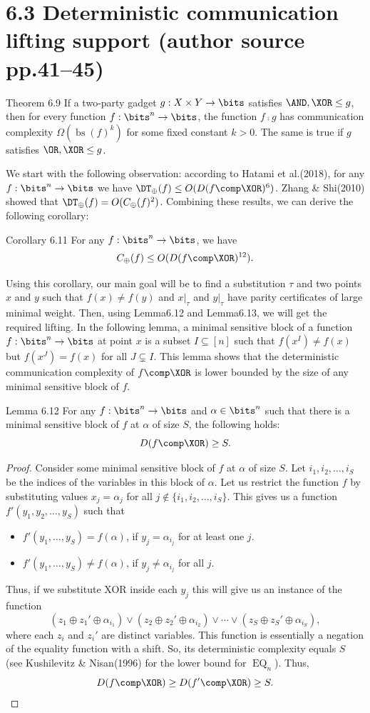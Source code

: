 \section*{6.3 Deterministic communication lifting support (author source pp.41--45)}
\begin{originalresult}{Theorem 6.9}
If a two-party gadget $g:X\times Y\to\bits$ satisfies $\AND,\XOR\le g$, then for every function $f:\bits^n\to\bits$, the function $f\comp g$ has communication complexity $\Omega(\operatorname{bs}(f)^k)$ for some fixed constant $k>0$. The same is true if $g$ satisfies $\OR,\XOR\le g$.
\end{originalresult}
We start with the following observation: according to Hatami et al.(2018), for any $f:\bits^n\to\bits$ we have $\DT_\oplus(f)\le O(D(f\comp\XOR)^6)$. Zhang \& Shi(2010) showed that $\DT_\oplus(f)=O(C_\oplus(f)^2)$. Combining these results, we can derive the following corollary:
\begin{originalresult}{Corollary 6.11}
For any $f:\bits^n\to\bits$, we have
\[C_\oplus(f)\le O(D(f\comp\XOR)^{12}).\]
\end{originalresult}
Using this corollary, our main goal will be to find a substitution $\tau$ and two points $x$ and $y$ such that $f(x)\ne f(y)$ and $x|_\tau$ and $y|_\tau$ have parity certificates of large minimal weight. Then, using Lemma6.12 and Lemma6.13, we will get the required lifting.
In the following lemma, a minimal sensitive block of a function $f:\bits^n\to\bits$ at point $x$ is a subset $I\subseteq[n]$ such that $f(x^I)\ne f(x)$ but $f(x^J)=f(x)$ for all $J\subsetneq I$. This lemma shows that the deterministic communication complexity of $f\comp\XOR$ is lower bounded by the size of any minimal sensitive block of $f$.
\begin{originalresult}{Lemma 6.12}
For any $f:\bits^n\to\bits$ and $\alpha\in\bits^n$ such that there is a minimal sensitive block of $f$ at $\alpha$ of size $S$, the following holds:
\[D(f\comp\XOR)\ge S.\]
\end{originalresult}
\begin{proof}
Consider some minimal sensitive block of $f$ at $\alpha$ of size $S$. Let $i_1,i_2,\ldots,i_S$ be the indices of the variables in this block of $\alpha$. Let us restrict the function $f$ by substituting values $x_j=\alpha_j$ for all $j\notin\{i_1,i_2,\ldots,i_S\}$. This gives us a function $f'(y_1,y_2,\ldots,y_S)$ such that
\begin{itemize}
\item $f'(y_1,\ldots,y_S)=f(\alpha)$, if $y_j=\alpha_{i_j}$ for at least one $j$.
\item $f'(y_1,\ldots,y_S)\ne f(\alpha)$, if $y_j\ne\alpha_{i_j}$ for all $j$.
\end{itemize}
Thus, if we substitute XOR inside each $y_j$ this will give us an instance of the function
\[(z_1\oplus z_1'\oplus\alpha_{i_1})\vee(z_2\oplus z_2'\oplus\alpha_{i_2})\vee\cdots\vee(z_S\oplus z_S'\oplus\alpha_{i_S}),\]
where each $z_i$ and $z_i'$ are distinct variables. This function is essentially a negation of the equality function with a shift. So, its deterministic complexity equals $S$ (see Kushilevitz \& Nisan(1996) for the lower bound for $\operatorname{EQ}_n$). Thus,
\[D(f\comp\XOR)\ge D(f'\comp\XOR)\ge S.\]
\end{proof}
